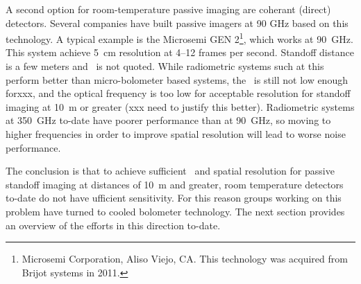 A second option for room-temperature passive imaging are coherant (direct) detectors. 
Several companies have built passive imagers at 90 GHz based on this technology.
A typical example is the Microsemi GEN 2\footnote{%
Microsemi Corporation, Aliso Viejo, CA. This technology was acquired from Brijot systems in 2011.}, which works at \SI{90}{\GHz}.
This system achieve \SI{5}{\cm} resolution at 4--12 frames per second.
Standoff distance is a few meters and \NETD\ is not quoted.
While radiometric systems such at this perform better than micro-bolometer based systems, the \NETD\ is still not low enough forxxx, and the optical frequency is too low for acceptable resolution for standoff imaging at \SI{10}{\m} or greater (xxx need to justify this better).
Radiometric systems at \SI{350}{\GHz} to-date have poorer performance than at \SI{90}{\GHz}, so moving to higher frequencies in order to improve spatial resolution will lead to worse noise performance.

The conclusion is that to achieve sufficient \NETD\ and spatial resolution for passive standoff imaging at distances of \SI{10}{\m} and greater, room temperature detectors to-date do not have ufficient sensitivity.
For this reason groups working on this problem have turned to cooled bolometer technology.
The next section provides an overview of the efforts in this direction to-date.

% 
